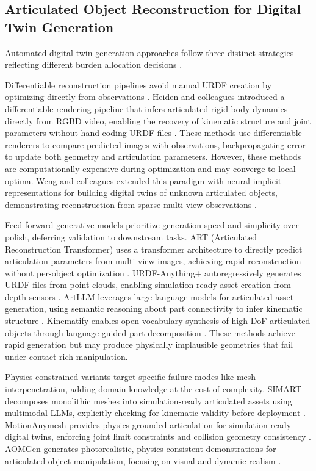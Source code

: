 \documentclass[12pt,a4paper,oneside]{report}
\begin{document}
\subsection{Articulated Object Reconstruction for Digital Twin Generation}

Automated digital twin generation approaches follow three distinct strategies reflecting different burden allocation decisions \cite{heiden2022inferring, weng2024neural, li2025art}.

Differentiable reconstruction pipelines avoid manual URDF creation by optimizing directly from observations \cite{heiden2022inferring, weng2024neural}. Heiden and colleagues introduced a differentiable rendering pipeline that infers articulated rigid body dynamics directly from RGBD video, enabling the recovery of kinematic structure and joint parameters without hand-coding URDF files \cite{heiden2022inferring}. These methods use differentiable renderers to compare predicted images with observations, backpropagating error to update both geometry and articulation parameters. However, these methods are computationally expensive during optimization and may converge to local optima. Weng and colleagues extended this paradigm with neural implicit representations for building digital twins of unknown articulated objects, demonstrating reconstruction from sparse multi-view observations \cite{weng2024neural}.

Feed-forward generative models prioritize generation speed and simplicity over polish, deferring validation to downstream tasks. ART (Articulated Reconstruction Transformer) uses a transformer architecture to directly predict articulation parameters from multi-view images, achieving rapid reconstruction without per-object optimization \cite{li2025art}. URDF-Anything+ autoregressively generates URDF files from point clouds, enabling simulation-ready asset creation from depth sensors \cite{wu2025urdfanything}. ArtLLM leverages large language models for articulated asset generation, using semantic reasoning about part connectivity to infer kinematic structure \cite{wang2025artllm}. Kinematify enables open-vocabulary synthesis of high-DoF articulated objects through language-guided part decomposition \cite{wang2025kinematify}. These methods achieve rapid generation but may produce physically implausible geometries that fail under contact-rich manipulation.

Physics-constrained variants target specific failure modes like mesh interpenetration, adding domain knowledge at the cost of complexity. SIMART decomposes monolithic meshes into simulation-ready articulated assets using multimodal LLMs, explicitly checking for kinematic validity before deployment \cite{zhang2025simart}. MotionAnymesh provides physics-grounded articulation for simulation-ready digital twins, enforcing joint limit constraints and collision geometry consistency \cite{xu2025motionanymesh}. AOMGen generates photorealistic, physics-consistent demonstrations for articulated object manipulation, focusing on visual and dynamic realism \cite{wu2024aomgen}.
\end{document}

